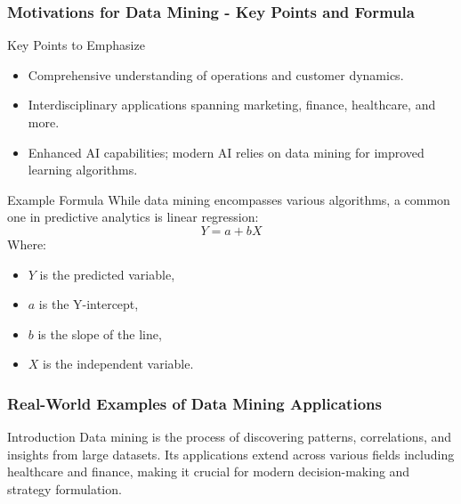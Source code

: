 \documentclass[aspectratio=169]{beamer}
\begin{document}
\begin{frame}[fragile]
    \frametitle{Motivations for Data Mining - Key Points and Formula}
    \begin{block}{Key Points to Emphasize}
        \begin{itemize}
            \item Comprehensive understanding of operations and customer dynamics.
            \item Interdisciplinary applications spanning marketing, finance, healthcare, and more.
            \item Enhanced AI capabilities; modern AI relies on data mining for improved learning algorithms.
        \end{itemize}
    \end{block}
    
    \begin{block}{Example Formula}
        While data mining encompasses various algorithms, a common one in predictive analytics is linear regression:
        \begin{equation}
            Y = a + bX
        \end{equation}
        Where:
        \begin{itemize}
            \item $Y$ is the predicted variable,
            \item $a$ is the Y-intercept,
            \item $b$ is the slope of the line,
            \item $X$ is the independent variable.
        \end{itemize}
    \end{block}
\end{frame}

\begin{frame}[fragile]
    \frametitle{Real-World Examples of Data Mining Applications}
    \begin{block}{Introduction}
        Data mining is the process of discovering patterns, correlations, and insights from large datasets. Its applications extend across various fields including healthcare and finance, making it crucial for modern decision-making and strategy formulation.
    \end{block}
\end{frame}
\end{document}
